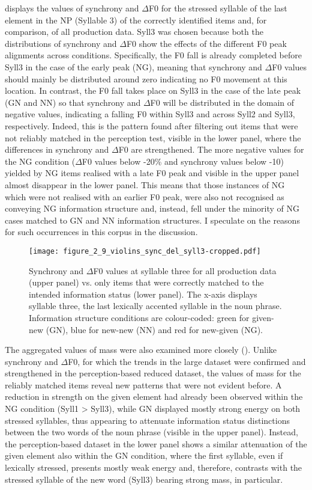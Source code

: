  displays the values of synchrony and ${\Delta}$F0 for the stressed syllable of the last element in the NP (Syllable 3) of the correctly identified items and, for comparison, of all production data. Syll3 was chosen because both the distributions of synchrony and ${\Delta}$F0 show the effects of the different F0 peak alignments across conditions. Specifically, the F0 fall is already completed before Syll3 in the case of the early peak (NG), meaning that synchrony and ${\Delta}$F0 values should mainly be distributed around zero indicating no F0 movement at this location. In contrast, the F0 fall takes place on Syll3 in the case of the late peak (GN and NN) so that synchrony and ${\Delta}$F0 will be distributed in the domain of negative values, indicating a falling F0 within Syll3 and across Syll2 and Syll3, respectively. Indeed, this is the pattern found after filtering out items that were not reliably matched in the perception test, visible in the lower panel, where the differences in synchrony and ${\Delta}$F0 are strengthened. The more negative values for the NG condition (${\Delta}$F0 values below -20\% and synchrony values below -10) yielded by NG items realised with a late F0 peak and visible in the upper panel almost disappear in the lower panel. This means that those instances of NG which were not realised with an earlier F0 peak, were also not recognised as conveying NG information structure and, instead, fell under the minority of NG cases matched to GN and NN information structures. I speculate on the reasons for such occurrences in this corpus in the discussion.



\begin{figure}
\texttt{[image: figure\_2\_9\_violins\_sync\_del\_syll3-cropped.pdf]}
\caption{Synchrony and ${\Delta}$F0 values at syllable three for all production data (upper panel) vs. only items that were correctly matched to the intended information status (lower panel). The x-axis displays syllable three, the last lexically accented syllable in the noun phrase. Information structure conditions are colour-coded: green for given-new (GN), blue for new-new (NN) and red for new-given (NG).}
\label{fig:2.9}
\end{figure}

The aggregated values of mass were also examined more closely (). Unlike synchrony and ${\Delta}$F0, for which the trends in the large dataset were confirmed and strengthened in the perception-based reduced dataset, the values of mass for the reliably matched items reveal new patterns that were not evident before. A reduction in strength on the given element had already been observed within the NG condition (Syll1 > Syll3), while GN displayed mostly strong energy on both stressed syllables, thus appearing to attenuate information status distinctions between the two words of the noun phrase (visible in the upper panel). Instead, the perception-based dataset in the lower panel shows a similar attenuation of the given element also within the GN condition, where the first syllable, even if lexically stressed, presents mostly weak energy and, therefore, contrasts with the stressed syllable of the new word (Syll3) bearing strong mass, in particular.

